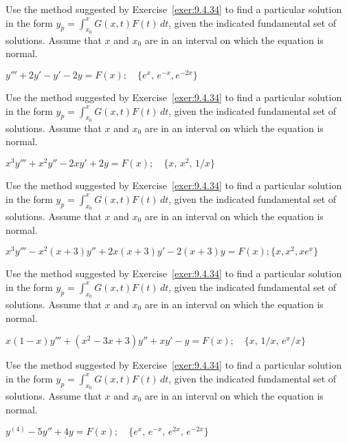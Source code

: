 \documentclass{ximera}
\begin{document}
\begin{problem}\label{exer:9.4.35}
Use the method suggested by Exercise~\ref{exer:9.4.34} to find a particular solution in the form
$y_p=\int_{x_0}^x G(x,t)F(t)\,dt$, given the indicated fundamental set of solutions.  Assume that $x$ and $x_0$ are in an interval on which
the equation is normal.

$y'''+2y'-y'-2y=F(x); \quad \{e^x,\,e^{-x},e^{-2x}\}$
\end{problem}

\begin{problem}\label{exer:9.4.36}
Use the method suggested by Exercise~\ref{exer:9.4.34} to find a particular solution in the form
$y_p=\int_{x_0}^x G(x,t)F(t)\,dt$, given the indicated fundamental set of solutions.  Assume that $x$ and $x_0$ are in an interval on which
the equation is normal.

$x^3y'''+x^2y''-2xy'+2y=F(x); \quad \{x,\,x^2,\,1/x\}$
\end{problem}

\begin{problem}\label{exer:9.4.37}
Use the method suggested by Exercise~\ref{exer:9.4.34} to find a particular solution in the form
$y_p=\int_{x_0}^x G(x,t)F(t)\,dt$, given the indicated fundamental set of solutions.  Assume that $x$ and $x_0$ are in an interval on which
the equation is normal.

$x^3y'''-x^2(x+3)y''+2x(x+3)y'-2(x+3)y=F(x); \{x,x^2,xe^x\}$
\end{problem}

\begin{problem}\label{exer:9.4.38}
Use the method suggested by Exercise~\ref{exer:9.4.34} to find a particular solution in the form
$y_p=\int_{x_0}^x G(x,t)F(t)\,dt$, given the indicated fundamental set of solutions.  Assume that $x$ and $x_0$ are in an interval on which
the equation is normal.

$x(1-x)y'''+(x^2-3x+3)y''+xy'-y=F(x); \quad \{x,\,1/x,\,e^x/x\}$
\end{problem}

\begin{problem}\label{exer:9.4.39}
Use the method suggested by Exercise~\ref{exer:9.4.34} to find a particular solution in the form
$y_p=\int_{x_0}^x G(x,t)F(t)\,dt$, given the indicated fundamental set of solutions.  Assume that $x$ and $x_0$ are in an interval on which
the equation is normal.

$y^{(4)}-5y''+4y=F(x); \quad \{e^x,\,e^{-x},\,e^{2x},\,e^{-2x}\}$
\end{problem}
\end{document}
